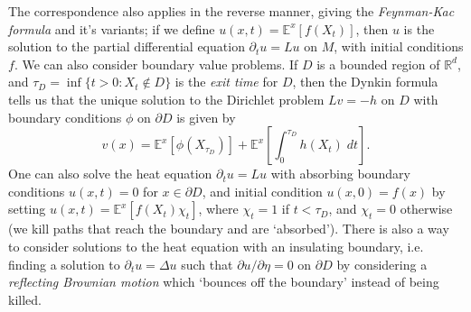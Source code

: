 \documentclass[12pt]{article}
\newcommand*{\R}{\mathbb{R}}
\begin{document}
The correspondence also applies in the reverse manner, giving the \emph{Feynman-Kac formula} and it's variants; if we define $u(x,t) = \mathbb{E}^x[f(X_t)]$, then $u$ is the solution to the partial differential equation $\partial_t u = Lu$ on $M$, with initial conditions $f$.
We can also consider boundary value problems. If $D$ is a bounded region of $\R^d$, and $\tau_D = \inf \{ t > 0 : X_t \not \in D \}$ is the \emph{exit time} for $D$, then the Dynkin formula tells us that the unique solution to the Dirichlet problem $Lv = -h$ on $D$ with boundary conditions $\phi$ on $\partial D$ is given by
%
\[ v(x) = \mathbb{E}^x[\phi(X_{\tau_D})] + \mathbb{E}^x \left[ \int_0^{\tau_D} h(X_t)\; dt \right]. \]
%
One can also solve the heat equation $\partial_t u = Lu$ with absorbing boundary conditions $u(x,t) = 0$ for $x \in \partial D$, and initial condition $u(x,0) = f(x)$ by setting $u(x,t) = \mathbb{E}^x[f(X_t) \chi_t ]$, where $\chi_t = 1$ if $t < \tau_D$, and $\chi_t = 0$ otherwise (we kill paths that reach the boundary and are `absorbed'). %
%
%
There is also a way to consider solutions to the heat equation with an insulating boundary, i.e. finding a solution to $\partial_t u = \Delta u$ such that $\partial u / \partial \eta = 0$ on $\partial D$ by considering a \emph{reflecting Brownian motion} which `bounces off the boundary' instead of being killed.
\end{document}
